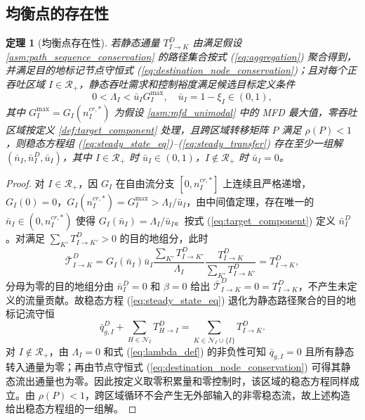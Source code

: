 \documentclass[a4paper,12pt]{article}
\theoremstyle{plain}
\newtheorem{theorem}{定理}[section]
\theoremstyle{definition}
\theoremstyle{remark}
\begin{document}
\subsection{均衡点的存在性}

\begin{theorem}[均衡点存在性]\label{thm:equilibrium_existence}
若静态通量 $T_{I\to K}^D$ 由满足假设 \ref{asm:path_sequence_conservation} 的路径集合按式 (\ref{eq:aggregation}) 聚合得到，并满足目的地标记节点守恒式 (\ref{eq:destination_node_conservation})；且对每个正吞吐区域 $I \in \mathcal{R}_+$，静态吞吐需求和控制裕度满足候选目标定义条件
\begin{equation}\label{eq:margin_feasibility}
    0<\Lambda_I < \bar u_I G_I^{\max},
    \quad \bar u_I=1-\xi_I\in(0,1),
\end{equation}
其中 $G_I^{\max} = G_I(n_I^{cr,*})$ 为假设 \ref{asm:mfd_unimodal} 中的 MFD 最大值，零吞吐区域按定义 \ref{def:target_component} 处理，且跨区域转移矩阵 $P$ 满足 $\rho(P)<1$，则稳态方程组 (\ref{eq:steady_state_eq})--(\ref{eq:steady_transfer}) 存在至少一组解 $(\bar{n}_I, \bar{n}_I^D, \bar{u}_I)$，其中 $I\in\mathcal R_+$ 时 $\bar{u}_I \in (0,1)$，$I\notin\mathcal R_+$ 时 $\bar u_I=0$。
\end{theorem}

\begin{proof}
对 $I\in\mathcal R_+$，因 $G_I$ 在自由流分支 $[0, n_I^{cr,*}]$ 上连续且严格递增，$G_I(0)=0$，$G_I(n_I^{cr,*})=G_I^{\max}>\Lambda_I/\bar u_I$，由中间值定理，存在唯一的 $\bar n_I\in(0,n_I^{cr,*})$ 使得 $G_I(\bar n_I)=\Lambda_I/\bar u_I$。按式 (\ref{eq:target_component}) 定义 $\bar n_I^D$。对满足 $\sum_{K'}T_{I\to K'}^D>0$ 的目的地组分，此时
\begin{equation}
    \bar{\mathcal T}_{I\to K}^D
    =
    G_I(\bar n_I)\bar u_I
    \frac{\sum_{K'}T_{I\to K'}^D}{\Lambda_I}
    \frac{T_{I\to K}^D}{\sum_{K'}T_{I\to K'}^D}
    =
    T_{I\to K}^D ,
\end{equation}
分母为零的目的地组分由 $\bar n_I^D=0$ 和 $\beta=0$ 给出 $\bar{\mathcal T}_{I\to K}^D=0=T_{I\to K}^D$，不产生未定义的流量贡献。故稳态方程 (\ref{eq:steady_state_eq}) 退化为静态路径聚合的目的地标记流守恒
\begin{equation}
    \bar q_{g,I}^D+\sum_{H\in\mathcal N_I}T_{H\to I}^D
    =
    \sum_{K\in\mathcal N_I\cup\{I\}}T_{I\to K}^D .
\end{equation}
对 $I\notin\mathcal R_+$，由 $\Lambda_I=0$ 和式 (\ref{eq:lambda_def}) 的非负性可知 $\bar q_{g,I}=0$ 且所有静态转入通量为零；再由节点守恒式 (\ref{eq:destination_node_conservation}) 可得其静态流出通量也为零。因此按定义取零积累量和零控制时，该区域的稳态方程同样成立。由 $\rho(P)<1$，跨区域循环不会产生无外部输入的非零稳态流，故上述构造给出稳态方程组的一组解。
\end{proof}
\end{document}
